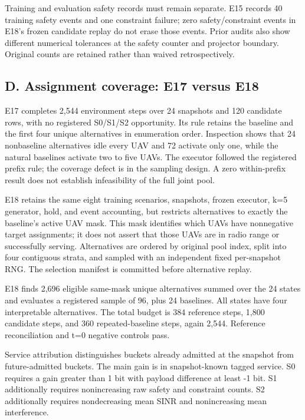 Training and evaluation safety records must remain separate. E15 records 40 training safety events and one constraint failure; zero safety/constraint events in E18's frozen candidate replay do not erase those events. Prior audits also show different numerical tolerances at the safety counter and projector boundary. Original counts are retained rather than waived retrospectively.

\subsection*{D. Assignment coverage: E17 versus E18}

E17 completes 2,544 environment steps over 24 snapshots and 120 candidate rows, with no registered S0/S1/S2 opportunity. Its rule retains the baseline and the first four unique alternatives in enumeration order. Inspection shows that 24 nonbaseline alternatives idle every UAV and 72 activate only one, while the natural baselines activate two to five UAVs. The executor followed the registered prefix rule; the coverage defect is in the sampling design. A zero within-prefix result does not establish infeasibility of the full joint pool.

E18 retains the same eight training scenarios, snapshots, frozen executor, k=5 generator, hold, and event accounting, but restricts alternatives to exactly the baseline's active UAV mask. This mask identifies which UAVs have nonnegative target assignments; it does not assert that those UAVs are in radio range or successfully serving. Alternatives are ordered by original pool index, split into four contiguous strata, and sampled with an independent fixed per-snapshot RNG. The selection manifest is committed before alternative replay.

E18 finds 2,696 eligible same-mask unique alternatives summed over the 24 states and evaluates a registered sample of 96, plus 24 baselines. All states have four interpretable alternatives. The total budget is 384 reference steps, 1,800 candidate steps, and 360 repeated-baseline steps, again 2,544. Reference reconciliation and t=0 negative controls pass.

Service attribution distinguishes buckets already admitted at the snapshot from future-admitted buckets. The main gain is in snapshot-known tagged service. S0 requires a gain greater than 1 bit with payload difference at least -1 bit. S1 additionally requires nonincreasing raw safety and constraint counts. S2 additionally requires nondecreasing mean SINR and nonincreasing mean interference.

